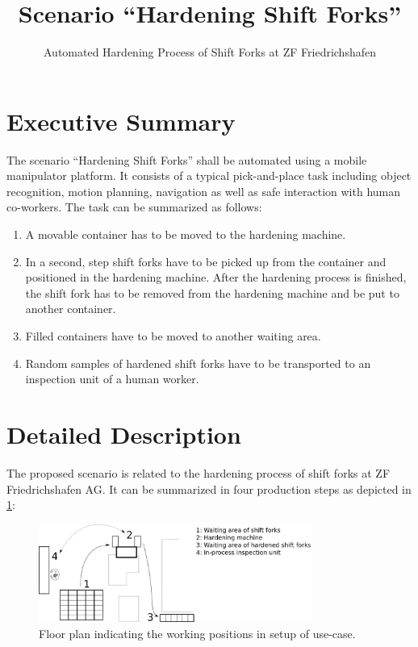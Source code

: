 \documentclass[11pt,english]{AMdocument}
\title{Scenario \enquote{Hardening Shift Forks}}
\subtitle{Automated Hardening Process of Shift Forks at ZF Friedrichshafen}
\begin{document}
	\maketitle
	
	\section*{Executive Summary}

The scenario \enquote{Hardening Shift Forks} shall be automated using a mobile manipulator platform. It consists of a typical pick-and-place task including object recognition, motion planning, navigation as well as safe interaction with human co-workers. The task can be summarized as follows:

\begin{enumerate}
	\item A movable container has to be moved to the hardening machine.
	\item In a second, step shift forks have to be picked up from the container and positioned in the hardening machine.
	After the hardening process is finished, the shift fork has to be removed from the hardening machine and be put to
	another container. 
	\item Filled containers have to be moved to another waiting area.
	\item Random samples of hardened shift forks have to be transported to an inspection unit of a human worker.
\end{enumerate}

	\section*{Detailed Description}

The proposed scenario is related to the hardening process of shift forks at ZF Friedrichshafen AG. It can be summarized in four production steps as depicted in \cref{fig:img1}: 

\begin{figure}[ht]
	\centering
	\includegraphics[width=0.8\textwidth]{img001}
	\caption{Floor plan indicating the working positions in setup of use-case.}
	\label{fig:img1}
\end{figure}
\end{document}
